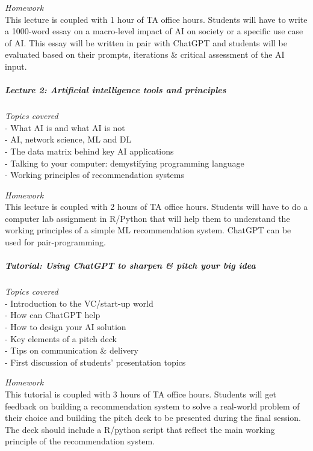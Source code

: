 \documentclass[
]{article}
\begin{document}
\emph{Homework}\\
This lecture is coupled with 1 hour of TA office hours. Students will
have to write a 1000-word essay on a macro-level impact of AI on society
or a specific use case of AI. This essay will be written in pair with
ChatGPT and students will be evaluated based on their prompts,
iterations \& critical assessment of the AI input.

\hypertarget{lecture-2-artificial-intelligence-tools-and-principles}{%
\subparagraph{\texorpdfstring{\textbf{Lecture 2: Artificial intelligence
tools and
principles}}{Lecture 2: Artificial intelligence tools and principles}}\label{lecture-2-artificial-intelligence-tools-and-principles}}

\emph{Topics covered}\\
- What AI is and what AI is not\\
- AI, network science, ML and DL\\
- The data matrix behind key AI applications\\
- Talking to your computer: demystifying programming language\\
- Working principles of recommendation systems

\emph{Homework}\\
This lecture is coupled with 2 hours of TA office hours. Students will
have to do a computer lab assignment in R/Python that will help them to
understand the working principles of a simple ML recommendation system.
ChatGPT can be used for pair-programming.

\hypertarget{tutorial-using-chatgpt-to-sharpen-pitch-your-big-idea}{%
\subparagraph{\texorpdfstring{\textbf{Tutorial: Using ChatGPT to sharpen
\& pitch your big
idea}}{Tutorial: Using ChatGPT to sharpen \& pitch your big idea}}\label{tutorial-using-chatgpt-to-sharpen-pitch-your-big-idea}}

\emph{Topics covered}\\
- Introduction to the VC/start-up world\\
- How can ChatGPT help\\
- How to design your AI solution\\
- Key elements of a pitch deck\\
- Tips on communication \& delivery\\
- First discussion of students' presentation topics

\emph{Homework}\\
This tutorial is coupled with 3 hours of TA office hours. Students will
get feedback on building a recommendation system to solve a real-world
problem of their choice and building the pitch deck to be presented
during the final session. The deck should include a R/python script that
reflect the main working principle of the recommendation system.
\end{document}
